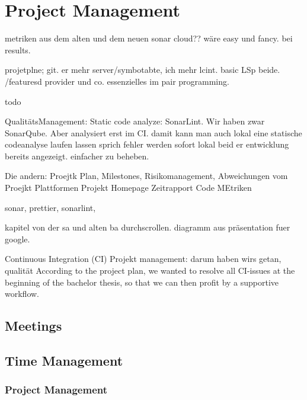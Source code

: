 \section{Project Management}
\label{section:project_management}


metriken aus dem alten und dem neuen sonar cloud?? wäre easy und fancy.  bei results.


projetplne; git. er mehr server/symbotabte, ich mehr lcint.
basic LSp beide. /featuresd provider und co. essenzielles im pair programming. 

todo

QualitätsManagement: Static code analyze: SonarLint. \cite{sonar-lint}
Wir haben zwar SonarQube. Aber analysiert erst im CI.
damit kann man auch lokal eine statische codeanalyse laufen lassen sprich fehler werden sofort lokal beid er
entwicklung bereits angezeigt. einfacher zu beheben.


Die andern:
Proejtk Plan, Milestones, Risikomanagement, Abweichungen vom Proejkt Plattformen
Projekt Homepage
Zeitrapport
Code MEtriken



sonar, prettier, sonarlint,

kapitel von der sa und alten ba durchscrollen.
diagramm aus präsentation fuer google.

Continuous Integration (CI)
Projekt management: darum haben wirs getan, qualität
According to the project plan, we wanted to resolve all CI-issues at the beginning of the bachelor thesis, so that we can then profit by a supportive workflow.



\subsection{Meetings}

\subsection{Time Management}
\subsubsection{Project Management}


